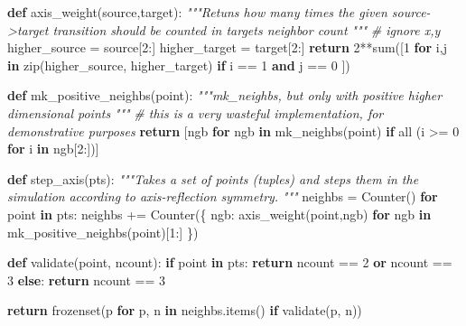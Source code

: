 \documentclass[]{article}
\newenvironment{Shaded}{}{}
\newcommand{\BuiltInTok}[1]{#1}
\newcommand{\CommentTok}[1]{\textcolor[rgb]{0.38,0.63,0.69}{\textit{#1}}}
\newcommand{\ControlFlowTok}[1]{\textcolor[rgb]{0.00,0.44,0.13}{\textbf{#1}}}
\newcommand{\DecValTok}[1]{\textcolor[rgb]{0.25,0.63,0.44}{#1}}
\newcommand{\KeywordTok}[1]{\textcolor[rgb]{0.00,0.44,0.13}{\textbf{#1}}}
\newcommand{\NormalTok}[1]{#1}
\newcommand{\OperatorTok}[1]{\textcolor[rgb]{0.40,0.40,0.40}{#1}}
\begin{document}
\begin{Shaded}
\begin{Highlighting}[]
\KeywordTok{def}\NormalTok{ axis\_weight(source,target):}
    \CommentTok{"""Retuns how many times the given source{-}>target transition should be}
\CommentTok{    counted in target\textquotesingle{}s neighbor count}
\CommentTok{    """}
    \CommentTok{\# ignore x,y}
\NormalTok{    higher\_source }\OperatorTok{=}\NormalTok{ source[}\DecValTok{2}\NormalTok{:]}
\NormalTok{    higher\_target }\OperatorTok{=}\NormalTok{ target[}\DecValTok{2}\NormalTok{:]}
    \ControlFlowTok{return} \DecValTok{2}\OperatorTok{**}\BuiltInTok{sum}\NormalTok{([}\DecValTok{1} \ControlFlowTok{for}\NormalTok{ i,j }\KeywordTok{in} \BuiltInTok{zip}\NormalTok{(higher\_source, higher\_target)}
                      \ControlFlowTok{if}\NormalTok{ i }\OperatorTok{==} \DecValTok{1} \KeywordTok{and}\NormalTok{ j }\OperatorTok{==} \DecValTok{0}
\NormalTok{                  ])}

\KeywordTok{def}\NormalTok{ mk\_positive\_neighbs(point):}
    \CommentTok{"""mk\_neighbs, but only with positive higher dimensional points}
\CommentTok{    """}
    \CommentTok{\# this is a very wasteful implementation, for demonstrative purposes}
    \ControlFlowTok{return}\NormalTok{ [ngb }\ControlFlowTok{for}\NormalTok{ ngb }\KeywordTok{in}\NormalTok{ mk\_neighbs(point) }\ControlFlowTok{if} \BuiltInTok{all}\NormalTok{ (i }\OperatorTok{>=} \DecValTok{0} \ControlFlowTok{for}\NormalTok{ i }\KeywordTok{in}\NormalTok{ ngb[}\DecValTok{2}\NormalTok{:])]}

\KeywordTok{def}\NormalTok{ step\_axis(pts):}
    \CommentTok{"""Takes a set of points (tuples) and steps them in the simulation}
\CommentTok{    according to axis{-}reflection symmetry.}
\CommentTok{    """}
\NormalTok{    neighbs }\OperatorTok{=}\NormalTok{ Counter()}
    \ControlFlowTok{for}\NormalTok{ point }\KeywordTok{in}\NormalTok{ pts:}
\NormalTok{        neighbs }\OperatorTok{+=}\NormalTok{ Counter(\{ ngb: axis\_weight(point,ngb)}
                               \ControlFlowTok{for}\NormalTok{ ngb }\KeywordTok{in}\NormalTok{ mk\_positive\_neighbs(point)[}\DecValTok{1}\NormalTok{:]}
\NormalTok{                           \})}

    \KeywordTok{def}\NormalTok{ validate(point, ncount):}
        \ControlFlowTok{if}\NormalTok{ point }\KeywordTok{in}\NormalTok{ pts:}
            \ControlFlowTok{return}\NormalTok{ ncount }\OperatorTok{==} \DecValTok{2} \KeywordTok{or}\NormalTok{ ncount }\OperatorTok{==} \DecValTok{3}
        \ControlFlowTok{else}\NormalTok{:}
            \ControlFlowTok{return}\NormalTok{ ncount }\OperatorTok{==} \DecValTok{3}

    \ControlFlowTok{return} \BuiltInTok{frozenset}\NormalTok{(p }\ControlFlowTok{for}\NormalTok{ p, n }\KeywordTok{in}\NormalTok{ neighbs.items() }\ControlFlowTok{if}\NormalTok{ validate(p, n))}
\end{Highlighting}
\end{Shaded}
\end{document}
